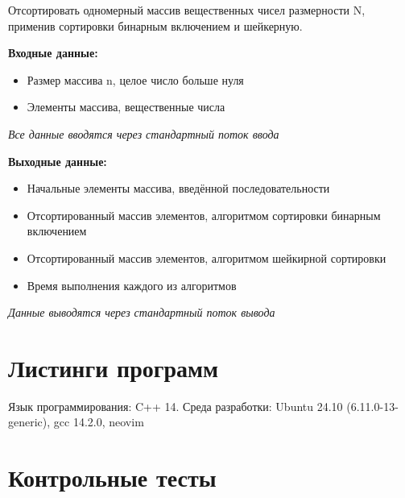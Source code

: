\documentclass[a4paper,12pt]{article}
\begin{document}
	Отсортировать одномерный массив вещественных чисел размерности N, 
	применив сортировки бинарным включением и шейкерную.

	\textbf{Входные данные:}
	\begin{itemize}
		\item Размер массива n, целое число больше нуля
		\item Элементы массива, вещественные числа
	\end{itemize}
	
	\textit{Все данные вводятся через стандартный поток ввода}
	
	\textbf{Выходные данные:}
	
	\begin{itemize}
		\item Начальные элементы массива, введённой последовательности
		\item Отсортированный массив элементов, алгоритмом сортировки бинарным включением
		\item Отсортированный массив элементов, алгоритмом шейкирной сортировки
		\item Время выполнения каждого из алгоритмов
	\end{itemize}
	
	\textit{Данные выводятся через стандартный поток вывода}
	
	\newpage
	\section{Листинги программ}
	Язык программирования: C++ 14. Среда разработки: Ubuntu 24.10 (6.11.0-13-generic), gcc 14.2.0, neovim
	
		
	\newpage
	\section{Контрольные тесты}
	
\end{document}
